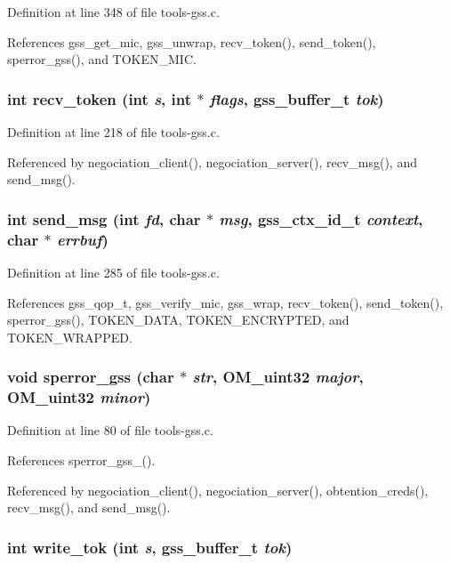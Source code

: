 Definition at line 348 of file tools-gss.c.

References gss\_\-get\_\-mic, gss\_\-unwrap, recv\_\-token(), send\_\-token(), sperror\_\-gss(), and TOKEN\_\-MIC.
\subsubsection{\setlength{\rightskip}{0pt plus 5cm}int recv\_\-token (int {\em s}, int $\ast$ {\em flags}, gss\_\-buffer\_\-t {\em tok})}\label{tools-gss_8h_a21}




Definition at line 218 of file tools-gss.c.

Referenced by negociation\_\-client(), negociation\_\-server(), recv\_\-msg(), and send\_\-msg().
\subsubsection{\setlength{\rightskip}{0pt plus 5cm}int send\_\-msg (int {\em fd}, char $\ast$ {\em msg}, gss\_\-ctx\_\-id\_\-t {\em context}, char $\ast$ {\em errbuf})}\label{tools-gss_8h_a20}




Definition at line 285 of file tools-gss.c.

References gss\_\-qop\_\-t, gss\_\-verify\_\-mic, gss\_\-wrap, recv\_\-token(), send\_\-token(), sperror\_\-gss(), TOKEN\_\-DATA, TOKEN\_\-ENCRYPTED, and TOKEN\_\-WRAPPED.
\subsubsection{\setlength{\rightskip}{0pt plus 5cm}void sperror\_\-gss (char $\ast$ {\em str}, OM\_\-uint32 {\em major}, OM\_\-uint32 {\em minor})}\label{tools-gss_8h_a16}




Definition at line 80 of file tools-gss.c.

References sperror\_\-gss\_().

Referenced by negociation\_\-client(), negociation\_\-server(), obtention\_\-creds(), recv\_\-msg(), and send\_\-msg().
\subsubsection{\setlength{\rightskip}{0pt plus 5cm}int write\_\-tok (int {\em s}, gss\_\-buffer\_\-t {\em tok})}\label{tools-gss_8h_a17}



